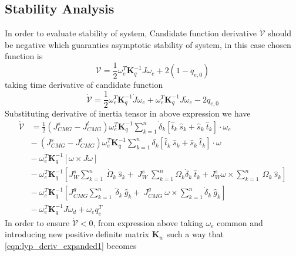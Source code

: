 \subsection{Stability Analysis}
In order to evaluate stability of system, Candidate function derivative $\displaystyle \dot{\mathcal{V}}$ should be negative which guaranties asymptotic stability of system, in this case chosen function is
\begin{equation}
\mathcal{V} =\frac{1}{2} \omega ^{T}_{e}\mathbf{K}^{-1}_{q} J\omega _{e} +2( 1-q_{e,0})
\end{equation}
taking time derivative of candidate function
\begin{equation}
\dot{\mathcal{V}} =\frac{1}{2} \omega ^{T}_{e}\mathbf{K}^{-1}_{q}\dot{J} \omega _{e} +\omega ^{T}_{e}\mathbf{K}^{-1}_{q} J\dot{\omega }_{e} -2\dot{q}_{e,0}
\end{equation}
Substituting derivative of inertia tensor in above expression we have
\begin{equation}
\begin{aligned}
\dot{\mathcal{V}} & =\frac{1}{2}\left( J^{s}_{CMG} -J^{t}_{CMG}\right) \omega ^{T}_{e}\mathbf{K}^{-1}_{q}\sum ^{n}_{k=1}\dot{\delta }_{k}[\hat{t}_{k} \ \hat{s}_{k} +\hat{s}_{k} \ \hat{t}_{k}] \cdotp \omega _{e}\\
 & -\ \left( J^{s}_{CMG} -J^{t}_{CMG}\right) \omega ^{T}_{e}\mathbf{K}^{-1}_{q}\sum ^{n}_{k=1}\dot{\delta }_{k}[\hat{t}_{k} \ \hat{s}_{k} +\hat{s}_{k} \ \hat{t}_{k}] \cdotp \omega \\
 & -\ \omega ^{T}_{e}\mathbf{K}^{-1}_{q}[ \omega \times J\omega ]\\
 & -\ \omega ^{T}_{e}\mathbf{K}^{-1}_{q}\left[ J^{s}_{W}\sum ^{n}_{k=1} \ \dot{\Omega }_{k} \ \hat{s}_{k} +\ J^{s}_{W} \ \sum ^{n}_{k=1} \Omega _{k}\dot{\delta }_{k} \ \hat{t}_{k} +J^{s}_{W} \omega \times \sum ^{n}_{k=1} \ \Omega _{k} \ \hat{s}_{k}\right]\\
 & -\ \omega ^{T}_{e}\mathbf{K}^{-1}_{q}\left[ J^{g}_{CMG}\sum ^{n}_{k=1} \ \ddot{\delta }_{k} \ \hat{g}_{k} +\ J^{g}_{CMG} \ \omega \times \sum ^{n}_{k=1}\dot{\delta }_{k} \ \hat{g}_{k}\right]\\
 & -\ \omega ^{T}_{e}\mathbf{K}^{-1}_{q} J\dot{\omega }_{d} +\omega _{e} q^{T}_{e}
\end{aligned}
\label{eqn:lyp_deriv_expanded1}
\end{equation}
In order to ensure $\displaystyle \dot{\mathcal{V}} < 0$, from expression above taking $\displaystyle \omega _{e}$ common and introducing new positive definite matrix $\displaystyle \mathbf{K}_{w}$ such a way that \autoref{eqn:lyp_deriv_expanded1} becomes
